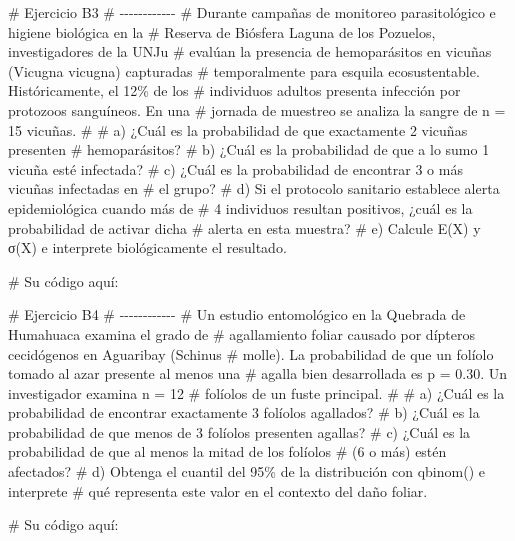 \documentclass[
  spanish,
  letterpaper,
  DIV=11,
  numbers=noendperiod]{scrreprt}
\newenvironment{Shaded}{\begin{snugshade}}{\end{snugshade}}
\newcommand{\CommentTok}[1]{\textcolor[rgb]{0.37,0.37,0.37}{#1}}
\begin{document}
\begin{Shaded}
\begin{Highlighting}[]
\CommentTok{\# Ejercicio B3}
\CommentTok{\# {-}{-}{-}{-}{-}{-}{-}{-}{-}{-}{-}{-}}
\CommentTok{\# Durante campañas de monitoreo parasitológico e higiene biológica en la}
\CommentTok{\# Reserva de Biósfera Laguna de los Pozuelos, investigadores de la UNJu}
\CommentTok{\# evalúan la presencia de hemoparásitos en vicuñas (Vicugna vicugna) capturadas}
\CommentTok{\# temporalmente para esquila ecosustentable. Históricamente, el 12\% de los}
\CommentTok{\# individuos adultos presenta infección por protozoos sanguíneos. En una}
\CommentTok{\# jornada de muestreo se analiza la sangre de n = 15 vicuñas.}
\CommentTok{\#}
\CommentTok{\# a) ¿Cuál es la probabilidad de que exactamente 2 vicuñas presenten}
\CommentTok{\#    hemoparásitos?}
\CommentTok{\# b) ¿Cuál es la probabilidad de que a lo sumo 1 vicuña esté infectada?}
\CommentTok{\# c) ¿Cuál es la probabilidad de encontrar 3 o más vicuñas infectadas en}
\CommentTok{\#    el grupo?}
\CommentTok{\# d) Si el protocolo sanitario establece alerta epidemiológica cuando más de}
\CommentTok{\#    4 individuos resultan positivos, ¿cuál es la probabilidad de activar dicha}
\CommentTok{\#    alerta en esta muestra?}
\CommentTok{\# e) Calcule E(X) y σ(X) e interprete biológicamente el resultado.}

\CommentTok{\# Su código aquí:}


\CommentTok{\# Ejercicio B4}
\CommentTok{\# {-}{-}{-}{-}{-}{-}{-}{-}{-}{-}{-}{-}}
\CommentTok{\# Un estudio entomológico en la Quebrada de Humahuaca examina el grado de}
\CommentTok{\# agallamiento foliar causado por dípteros cecidógenos en Aguaribay (Schinus}
\CommentTok{\# molle). La probabilidad de que un folíolo tomado al azar presente al menos una}
\CommentTok{\# agalla bien desarrollada es p = 0.30. Un investigador examina n = 12}
\CommentTok{\# folíolos de un fuste principal.}
\CommentTok{\#}
\CommentTok{\# a) ¿Cuál es la probabilidad de encontrar exactamente 3 folíolos agallados?}
\CommentTok{\# b) ¿Cuál es la probabilidad de que menos de 3 folíolos presenten agallas?}
\CommentTok{\# c) ¿Cuál es la probabilidad de que al menos la mitad de los folíolos}
\CommentTok{\#    (6 o más) estén afectados?}
\CommentTok{\# d) Obtenga el cuantil del 95\% de la distribución con qbinom() e interprete}
\CommentTok{\#    qué representa este valor en el contexto del daño foliar.}

\CommentTok{\# Su código aquí:}



\end{Highlighting}
\end{Shaded}
\end{document}
